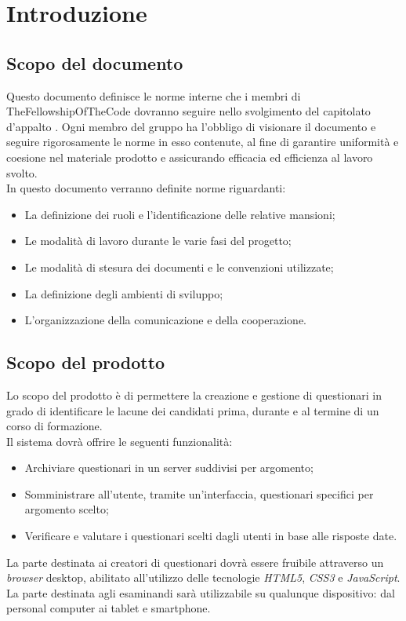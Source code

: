 \section{Introduzione}

\subsection{Scopo del documento}
Questo documento definisce le norme interne che i membri di TheFellowshipOfTheCode dovranno seguire nello svolgimento del capitolato d'appalto \progetto. Ogni membro del gruppo ha l'obbligo di visionare il documento e seguire rigorosamente le norme in esso contenute, al fine di garantire uniformità e coesione nel materiale prodotto e assicurando efficacia ed efficienza al lavoro svolto.
\\In questo documento verranno definite norme riguardanti:
\begin{itemize}
\item
La definizione dei ruoli e l'identificazione delle relative mansioni;	
\item
Le modalità di lavoro durante le varie fasi del progetto;
\item
Le modalità di stesura dei documenti e le convenzioni utilizzate;
\item
La definizione degli ambienti di sviluppo;
\item
L'organizzazione della comunicazione e della cooperazione.
\end{itemize}

\subsection{Scopo del prodotto}
Lo scopo del prodotto è di permettere la creazione e gestione di questionari in grado di identificare le lacune dei candidati prima, durante e al termine di un corso di formazione. 
\\Il sistema dovrà offrire le seguenti funzionalità:
\begin{itemize}
\item
Archiviare questionari in un server suddivisi per argomento;
\item
Somministrare all'utente, tramite un'interfaccia, questionari specifici per argomento scelto;
\item
Verificare e valutare i questionari scelti dagli utenti in base alle risposte date.
\end{itemize}
La parte destinata ai creatori di questionari dovrà essere fruibile attraverso un \textit{browser} desktop, abilitato all'utilizzo delle tecnologie \textit{HTML5}, \textit{CSS3} e \textit{JavaScript}. La parte destinata agli esaminandi sarà utilizzabile su qualunque dispositivo: dal personal computer ai tablet e smartphone.

